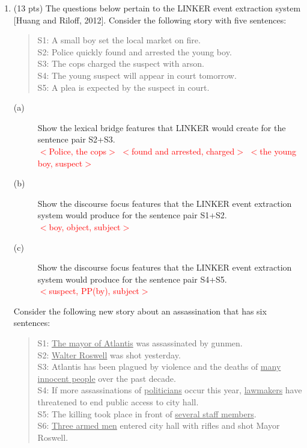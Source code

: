 \documentclass[11pt]{article}
\begin{document}
\begin{enumerate}
\begin{enumerate}
\end{enumerate}


\newpage

\item (13 pts) The questions below pertain to the LINKER
 event extraction system [Huang and Riloff,
  2012]. Consider the following story with five sentences:
\begin{quote}
S1: A small boy set the local market on fire. \\
S2: Police quickly found and arrested the young boy. \\
S3: The cops charged the suspect with arson. \\
S4: The young suspect will appear in court tomorrow.  \\
S5: A plea is expected by the suspect in court. \\
\end{quote}

\begin{description}
\item[(a)] Show the lexical bridge features that LINKER would create for
  the sentence pair S2+S3.  \\
  \textcolor{red}{$<$Police, the cops$>$ $<$found and arrested, charged$>$ $<$the young boy, suspect$>$  }


\item[(b)] Show the discourse focus features that the LINKER event
  extraction system would produce for the sentence pair S1+S2. \\
\textcolor{red}{$<$boy, object, subject$>$}

\item[(c)] Show the discourse focus features that the LINKER event
  extraction system would produce for the sentence pair  S4+S5.  \\
  \textcolor{red}{$<$suspect, PP(by), subject$>$}


\end{description}


Consider the following new story about an assassination that has six sentences:
\begin{quote}
S1: \underline{The mayor of Atlantis} was assassinated by gunmen. \\
S2: \underline{Walter Roswell} was shot yesterday.\\
S3: Atlantis has been plagued by violence and the deaths of
\underline{many innocent people} over the past decade. \\ 
S4: If more assassinations of \underline{politicians} occur this year, \underline{lawmakers} have
threatened to end public access to city hall.  \\
S5: The killing took place in front of \underline{several staff
  members}. \\
S6: \underline{Three armed men} entered city hall with rifles and shot
 Mayor Roswell.
\end{quote}


\end{enumerate}
\end{document}
